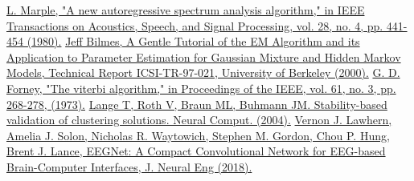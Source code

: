 \documentclass[a4paper,14pt]{extarticle}
\begin{document}
\begin{thebibliography}{0}
	\hypertarget{b_10}{}
	\href{https://ieeexplore.ieee.org/document/1163429}
	{L. Marple, "A new autoregressive spectrum analysis algorithm," in IEEE Transactions on Acoustics, Speech, and Signal Processing, vol. 28, no. 4, pp. 441-454 (1980).}
	\hypertarget{b_11}{}
	\href{https://www.semanticscholar.org/paper/A-gentle-tutorial-of-the-em-algorithm-and-its-to-Bilmes/3a5fa1ea14cea5e55e4e1f844f78332fccefa285}
	{Jeff Bilmes, A Gentle Tutorial of the EM Algorithm and its Application to Parameter Estimation for Gaussian Mixture and Hidden Markov Models, Technical Report ICSI-TR-97-021, University of Berkeley (2000).}
	\hypertarget{b_12}{}
	\href{https://ieeexplore.ieee.org/document/1450960}
	{G. D. Forney, "The viterbi algorithm," in Proceedings of the IEEE, vol. 61, no. 3, pp. 268-278, (1973).}
	\hypertarget{b_13}{}
	\href{https://pubmed.ncbi.nlm.nih.gov/15130251/}
	{Lange T, Roth V, Braun ML, Buhmann JM. Stability-based validation of clustering solutions. Neural Comput. (2004).}
	\hypertarget{b_14}{}
	\href{https://iopscience.iop.org/article/10.1088/1741-2552/aace8c}
	{Vernon J. Lawhern, Amelia J. Solon, Nicholas R. Waytowich, Stephen M. Gordon, Chou P. Hung, Brent J. Lance, EEGNet: A Compact Convolutional Network for EEG-based Brain-Computer Interfaces, J. Neural Eng (2018).}
\end{thebibliography}
	
	
\end{document}
